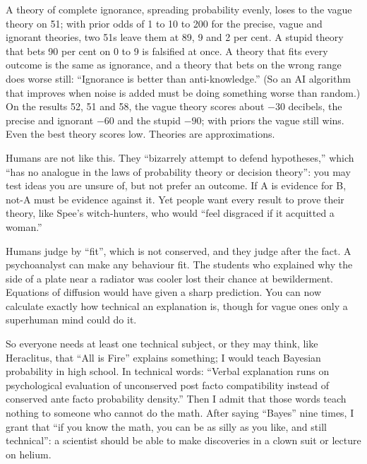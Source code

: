 A theory of complete ignorance, spreading probability evenly, loses to the vague theory on 51; with prior odds of 1 to 10 to 200 for the precise, vague and ignorant theories, two 51s leave them at 89, 9 and 2 per cent. A stupid theory that bets 90 per cent on 0 to 9 is falsified at once. A theory that fits every outcome is the same as ignorance, and a theory that bets on the wrong range does worse still: ``Ignorance is better than anti-knowledge.'' (So an AI algorithm that improves when noise is added must be doing something worse than random.) On the results 52, 51 and 58, the vague theory scores about $-30$ decibels, the precise and ignorant $-60$ and the stupid $-90$; with priors the vague still wins. Even the best theory scores low. Theories are approximations.

Humans are not like this. They ``bizarrely attempt to defend hypotheses,'' which ``has no analogue in the laws of probability theory or decision theory'': you may test ideas you are unsure of, but not prefer an outcome. If A is evidence for B, not-A must be evidence against it. Yet people want every result to prove their theory, like Spee's witch-hunters, who would ``feel disgraced if it acquitted a woman.'' 

Humans judge by ``fit'', which is not conserved, and they judge after the fact. A psychoanalyst can make any behaviour fit. The students who explained why the side of a plate near a radiator was cooler lost their chance at bewilderment. Equations of diffusion would have given a sharp prediction. You can now calculate exactly how technical an explanation is, though for vague ones only a superhuman mind could do it.

So everyone needs at least one technical subject, or they may think, like Heraclitus, that ``All is Fire'' explains something; I would teach Bayesian probability in high school. In technical words: ``Verbal explanation runs on psychological evaluation of unconserved post facto compatibility instead of conserved ante facto probability density.'' Then I admit that those words teach nothing to someone who cannot do the math. After saying ``Bayes'' nine times, I grant that ``if you know the math, you can be as silly as you like, and still technical'': a scientist should be able to make discoveries in a clown suit or lecture on helium.

